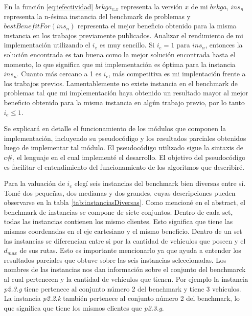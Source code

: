 En la función \eqref{eq:iefectividad} $brkga_{v.x}$ representa la versión $x$ de mi $brkga$, $ins_n$ representa la n-ésima instancia del benchmark de problemas y $bestBenefitFor(ins_n)$ representa el mejor beneficio obtenido para la misma instancia en los trabajos previamente publicados. Analizar el rendimiento de mi implementación utilizando el $i_e$ es muy sencillo. Si $i_e = 1$ para $ins_n$, entonces la solución encontrada es tan buena como la mejor solución encontrada hasta el momento, lo que significa que mi implementación es óptima para la instancia $ins_n$. Cuanto más cercano a 1 es $i_e$, más competitiva es mi implentación frente a los trabajos previos. Lamentablemente no existe instancia en el benchmark de problemas tal que mi implementación haya obtenido un resultado mayor al mejor beneficio obtenido para la misma instancia en algún trabajo previo, por lo tanto $i_e \leq 1$.

\bigskip

Se explicará en detalle el funcionamiento de los módulos que componen la implementación, incluyendo su pseudocódigo y los resultados parciales obtenidos luego de implementar tal módulo. El pseudocódigo utilizado sigue la sintaxis de c\#, el lenguaje en el cual implementé el desarrollo. El objetivo del pseudocódigo es facilitar el entendimiento del funcionamiento de los algoritmos que describiré.


\bigskip

Para la valuación de $i_e$ elegí seis instancias del benchmark bien diversas entre sí. Tomé dos pequeñas, dos medianas y dos grandes, cuyas descripciones pueden observarse en la tabla \ref{tab:instanciasDiversas}. Como mencioné en el abstract, el benchmark de instancias se compone de siete conjuntos. Dentro de cada set, todas las instancias contienen los mismo clientes. Esto significa que tiene las mismas coordenadas en el eje cartesiano y el mismo beneficio. Dentro de un set las instancias se diferencian entre si por la cantidad de vehículos que poseen y el $d_{max}$ de sus rutas. Esto es importante mencionarlo ya que ayuda a entender los resultados parciales que obtuve sobre las seis instancias seleccionadas. Los nombres de las instancias nos dan información sobre el conjunto del benchmarck al cual pertenecen y la cantidad de vehículos que tienen. Por ejemplo la instancia \textit{p2.3.g} tiene pertenece al conjunto número 2 del benchmark y tiene 3 vehículos. La instancia \textit{p2.2.k} también pertenece al conjunto número 2 del benchmark, lo que significa que tiene los mismos clientes que \textit{p2.3.g}.

